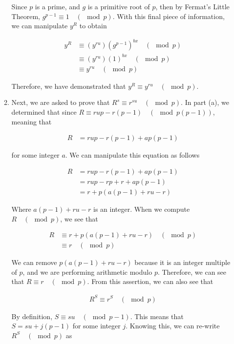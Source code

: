 \documentclass[11pt]{article}
\theoremstyle{definition}
\begin{document}
\begin{enumerate}
\begin{enumerate}
Since $p$ is a prime, and $g$ is a primitive root of $p$, then by Fermat's Little Theorem, $g^{p - 1} \equiv 1 \quad (\mod{p})$. With this final piece of information, we can manipulate $y^R$ to obtain

\begin{align*}
    y^R &\equiv (y^{ru}) (g^{p - 1})^{bx} \quad (\mod{p}) \\
    &\equiv (y^{ru}) (1)^{bx} \quad (\mod{p}) \\
    &\equiv y^{ru} \quad (\mod{p})
\end{align*}

Therefore, we have demonstrated that $y^R \equiv y^{ru} \quad (\mod{p})$.
\\

\item %

Next, we are asked to prove that $R^s \equiv r^{su} \quad (\mod{p})$. In part (a), we determined that since $R \equiv rup - r(p-1) \quad (\mod{p(p-1)})$, meaning that

\begin{align*}
    R &= rup - r(p - 1) + ap(p-1)
\end{align*}

for some integer $a$. We can manipulate this equation as follows

\begin{align*}
    R &= rup - r(p - 1) + ap(p - 1) \\
    &= rup - rp + r + ap(p - 1) \\
    &= r + p(a(p-1) + ru - r)
\end{align*}

Where $a(p-1) + ru - r$ is an integer. When we compute $R \quad (\mod{p})$, we see that

\begin{align*}
    R &\equiv r + p(a(p - 1) + ru - r) \quad (\mod{p}) \\
    &\equiv r \quad (\mod{p})
\end{align*}

We can remove $p(a(p - 1) + ru - r)$ because it is an integer multiple of $p$, and we are performing arithmetic modulo $p$. Therefore, we can see that $R \equiv r \quad (\mod{p})$. From this assertion, we can also see that

\begin{align*}
    R^S \equiv r^S \quad (\mod{p})
\end{align*}

By definition, $S \equiv su \quad (\mod{p - 1})$. This means that $S = su + j(p - 1)$ for some integer $j$. Knowing this, we can re-write $R^S \quad (\mod{p})$ as


\end{enumerate}
\end{enumerate}
\end{document}
